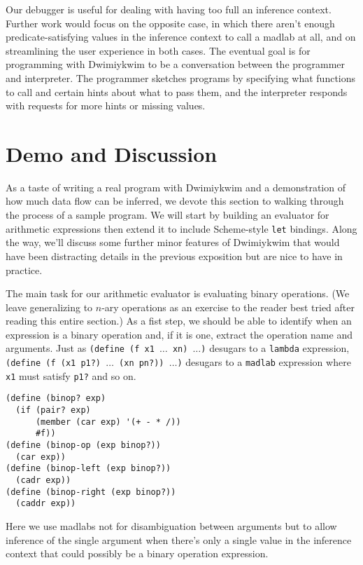\documentclass[11pt]{article}
\begin{document}
Our debugger is useful for dealing with having too full an inference context.
Further work would focus on the opposite case, in which
there aren't enough predicate-satisfying values in the inference context
to call a madlab at all,
and on streamlining the user experience in both cases.
The eventual goal is for programming with Dwimiykwim to be
a conversation between the programmer and interpreter.
The programmer sketches programs by specifying what functions to call
and certain hints about what to pass them,
and the interpreter responds with requests for more hints or missing values.


\section{Demo and Discussion}

As a taste of writing a real program with Dwimiykwim
and a demonstration of how much data flow can be inferred,
we devote this section to walking through the process of a sample program.
We will start by building an evaluator for arithmetic expressions
then extend it to include Scheme-style \texttt{let} bindings.
Along the way, we'll discuss some further minor features of Dwimiykwim
that would have been distracting details in the previous exposition
but are nice to have in practice.

The main task for our arithmetic evaluator is evaluating binary operations.
(We leave generalizing to $n$-ary operations as an exercise to the reader
best tried after reading this entire section.)
As a fist step, we should be able to identify
when an expression is a binary operation
and, if it is one, extract the operation name and arguments.
Just as \texttt{(define (f x1 $\dots$ xn) $\dots$)}
desugars to a \texttt{lambda} expression,
\texttt{(define (f (x1 p1?) $\dots$ (xn pn?)) $\dots$)}
desugars to a \texttt{madlab} expression
where \texttt{x1} must satisfy \texttt{p1?} and so on.
\begin{Verbatim}
(define (binop? exp)
  (if (pair? exp)
      (member (car exp) '(+ - * /))
      #f))
(define (binop-op (exp binop?))
  (car exp))
(define (binop-left (exp binop?))
  (cadr exp))
(define (binop-right (exp binop?))
  (caddr exp))
\end{Verbatim}
Here we use madlabs not for disambiguation between arguments
but to allow inference of the single argument
when there's only a single value in the inference context
that could possibly be a binary operation expression.
\end{document}
